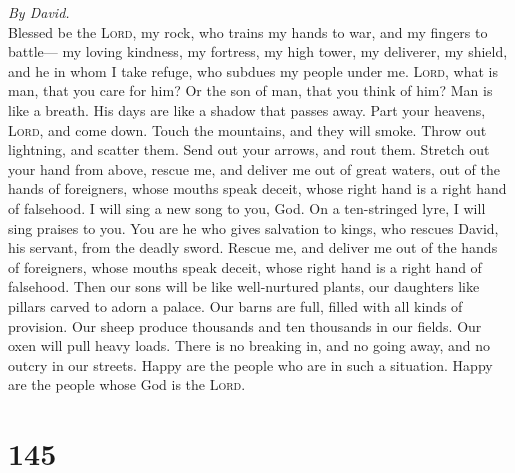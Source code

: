 \emph{By David.}\\
 Blessed be the \textsc{Lord}, my rock, who trains my
hands to war, and my fingers to battle---  my loving
kindness, my fortress, my high tower, my deliverer, my shield, and he in
whom I take refuge, who subdues my people under me. 
\textsc{Lord}, what is man, that you care for him? Or the son of man,
that you think of him?  Man is like a breath. His days are
like a shadow that passes away.  Part your heavens,
\textsc{Lord}, and come down. Touch the mountains, and they will smoke.
 Throw out lightning, and scatter them. Send out your
arrows, and rout them.  Stretch out your hand from above,
rescue me, and deliver me out of great waters, out of the hands of
foreigners,  whose mouths speak deceit, whose right hand
is a right hand of falsehood.  I will sing a new song to
you, God. On a ten-stringed lyre, I will sing praises to you.
 You are he who gives salvation to kings, who rescues
David, his servant, from the deadly sword.  Rescue me,
and deliver me out of the hands of foreigners, whose mouths speak
deceit, whose right hand is a right hand of falsehood. 
Then our sons will be like well-nurtured plants, our daughters like
pillars carved to adorn a palace.  Our barns are full,
filled with all kinds of provision. Our sheep produce thousands and ten
thousands in our fields.  Our oxen will pull heavy loads.
There is no breaking in, and no going away, and no outcry in our
streets.  Happy are the people who are in such a
situation. Happy are the people whose God is the \textsc{Lord}.

\hypertarget{section-144}{%
\section{145}\label{section-144}}

